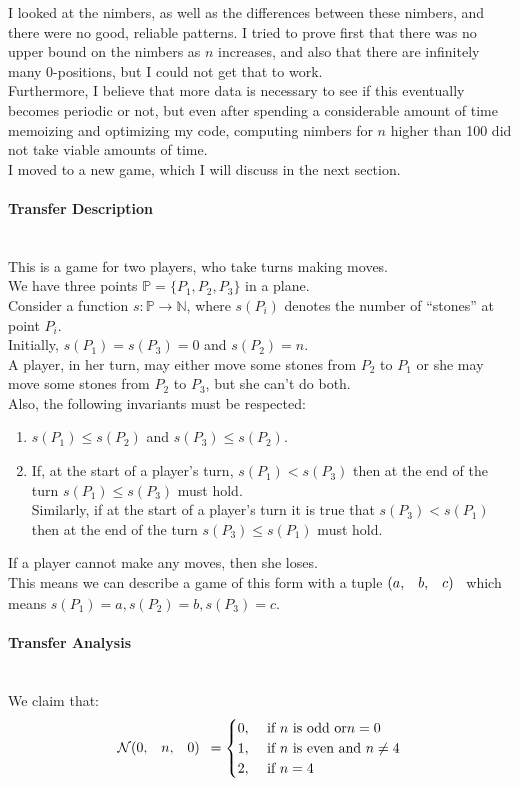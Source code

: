 \documentclass{article}
\makeatletter
\newcommand{\N}{\mathbb{N}}
\newcommand{\T}[1]{\text{#1}}
\newcommand{\nim}{\mathcal{N}}
\newcommand{\game}[3]{\begin{array}{@{}*6r}(#1, & #2, & #3)\end{array}}
\makeatother
\begin{document}
I looked at the nimbers, as well as the differences between these
nimbers, and there were no good, reliable patterns. I tried to prove
first that there was no upper bound on the nimbers as $n$ increases,
and also that there are infinitely many $0$-positions, but I could not
get that to work. \\
Furthermore, I believe that more data is necessary to see if this
eventually becomes periodic or not, but even after spending a considerable
amount of time memoizing and optimizing my code, computing nimbers
for $n$ higher than 100 did not take viable amounts of time. \\
I moved to a new game, which I will discuss in the next section.
\newpage

\paragraph{Transfer Description}\mbox{}\\
This is a game for two players, who take turns making moves. \\
We have three points $\mathbb{P} = \{P_1, P_2, P_3\}$ in a plane. \\
Consider a function $s : \mathbb{P} \rightarrow \N$, where
$s(P_i)$ denotes the number of ``stones'' at point $P_i$. \\
Initially, $s(P_1) = s(P_3) = 0$ and $s(P_2) = n$. \\
A player, in her turn, may either move some stones from
$P_2$ to $P_1$ or she may move some stones from $P_2$ to $P_3$,
but she can't do both. \\
Also, the following invariants must be respected:
\begin{enumerate}
  \item $s(P_1) \leq s(P_2)$ and $s(P_3) \leq s(P_2)$.
  \item If, at the start of a player's turn, $s(P_1) < s(P_3)$ then
    at the end of the turn $s(P_1) \leq s(P_3)$ must hold. \\
    Similarly, if at the start of a player's turn it is true that
    $s(P_3) < s(P_1)$ then at the end of the turn
    $s(P_3) \leq s(P_1)$ must hold.
\end{enumerate}
If a player cannot make any moves, then she loses. \\
This means we can describe a game of this form with a tuple
$\game{a}{b}{c}$ which means $s(P_1) = a, s(P_2) = b, s(P_3) = c$. \\

\paragraph{Transfer Analysis}\mbox{}\\
We claim that:
\begin{equation*}
  \nim\game{0}{n}{0} =
  \begin{cases}
    0, & \ \T{if}\ n \ \T{is odd or} n = 0 \\
    1, & \ \T{if}\ n \ \T{is even and}\ n \neq 4 \\
    2, & \ \T{if}\ n = 4
  \end{cases}
\end{equation*}
\end{document}
